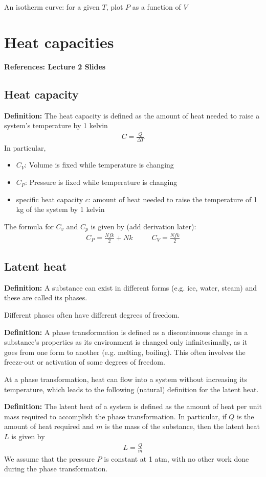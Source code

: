 \documentclass[11pt]{article}
\begin{document}
An isotherm curve: for a given $T$, plot $P$ as a function of $V$


\section{Heat capacities}
\textbf{References: Lecture 2 Slides}

\subsection{Heat capacity}
\textbf{Definition:} The heat capacity is defined as the amount of heat needed to raise a system's temperature by 1 kelvin 
\begin{align*}
    C = \frac{Q}{\Delta T}
\end{align*}
In particular, 
\begin{itemize}
\item $C_V$: Volume is fixed while temperature is changing
\item $C_P$: Pressure is fixed while temperature is changing
\item specific heat capacity $c$: amount of heat needed to raise the temperature of 1 kg of the system by 1 kelvin
\end{itemize}
The formula for $C_v$ and $C_p$ is given by (add derivation later): 
\begin{align*}
    C_P = \frac{Nfk}{2} + Nk ~~~~~~~~~~~~ C_V = \frac{Nfk}{2}
\end{align*}

\subsection{Latent heat}
\textbf{Definition:} A substance can exist in different forms (e.g. ice, water, steam) and these are called its phases. 

Different phases often have different degrees of freedom. 

\textbf{Definition:} A phase transformation is defined as a discontinuous change in a substance's properties as its environment is changed only infinitesimally, as it goes from one form to another (e.g. melting, boiling). This often involves the freeze-out or activation of some degrees of freedom. 

At a phase transformation, heat can flow into a system without increasing its temperature, which leads to the following (natural) definition for the latent heat. 

\textbf{Definition:} The latent heat of a system is defined as the amount of heat per unit mass required to accomplish the phase transformation. In particular, if $Q$ is the amount of heat required and $m$ is the mass of the substance, then the latent heat $L$ is given by
\begin{align*}
    L = \frac{Q}{m}
\end{align*}
We assume that the pressure $P$ is constant at 1 atm, with no other work done during the phase transformation. 
\end{document}
